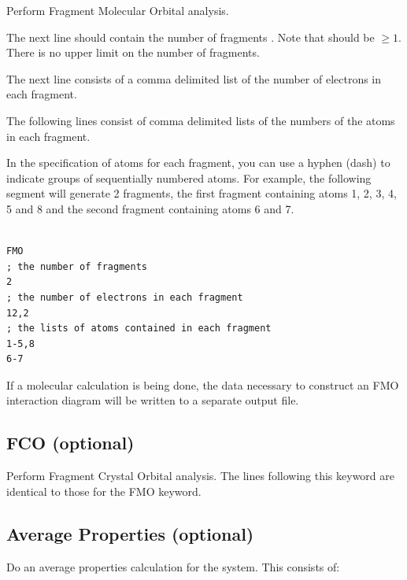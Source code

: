 Perform Fragment Molecular Orbital analysis.

The next line should contain the number of fragments
.  Note that  should be
$\geq 1$.  There is no upper limit on the number of fragments.

The next line consists of a comma delimited list of the number of
electrons in each fragment.

The following  lines consist of comma delimited
lists of the numbers of the atoms in each fragment.

In the specification of atoms for each fragment, you can use a hyphen
(dash) to indicate groups of sequentially numbered atoms.
For example, the following segment will generate 2 fragments, the
first fragment containing atoms 1, 2, 3, 4, 5 and 8 and the second fragment
containing atoms 6 and 7. \\


\shrinkspacing
\begin{verbatim}

FMO
; the number of fragments
2
; the number of electrons in each fragment
12,2
; the lists of atoms contained in each fragment
1-5,8
6-7

\end{verbatim}
\resumespacing

If a molecular calculation is being done, the data necessary to
construct an FMO interaction diagram will be written to a separate
output file.

\subsection{{\sf FCO} (optional)}

Perform Fragment Crystal Orbital analysis.
The lines following this keyword are identical to those for the {\sf
FMO} keyword.


\subsection{{\sf Average Properties} (optional)}

Do an average properties calculation for the system.  This consists
of:

